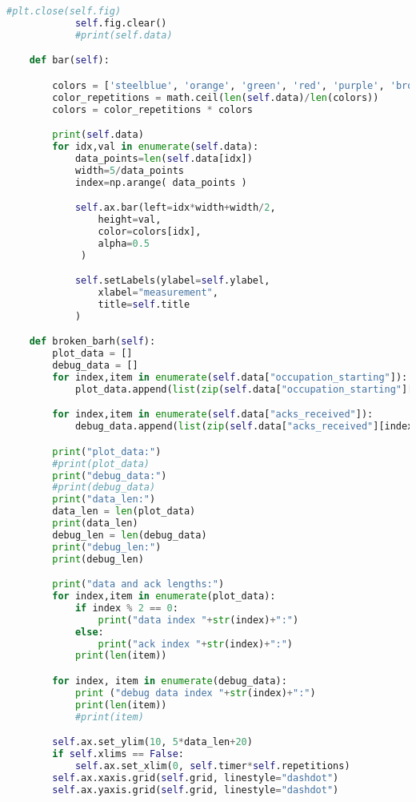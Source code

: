 \begin{lstlisting}[language=Python,caption=myplot.py]
            #plt.close(self.fig)
            self.fig.clear()
            #print(self.data)

    def bar(self):

        colors = ['steelblue', 'orange', 'green', 'red', 'purple', 'brown', 'pink']
        color_repetitions = math.ceil(len(self.data)/len(colors))
        colors = color_repetitions * colors

        print(self.data)
        for idx,val in enumerate(self.data):
            data_points=len(self.data[idx])
            width=5/data_points
            index=np.arange( data_points )

            self.ax.bar(left=idx*width+width/2,
                height=val,
                color=colors[idx],
                alpha=0.5
             )

            self.setLabels(ylabel=self.ylabel,
                xlabel="measurement",
                title=self.title
            )

    def broken_barh(self):
        plot_data = []
        debug_data = []
        for index,item in enumerate(self.data["occupation_starting"]):
            plot_data.append(list(zip(self.data["occupation_starting"][index], self.data["occupation_durations"][index])))

        for index,item in enumerate(self.data["acks_received"]):
            debug_data.append(list(zip(self.data["acks_received"][index], self.data["acks_received_bar_width"][index])))

        print("plot_data:")
        #print(plot_data)
        print("debug_data:")
        #print(debug_data)
        print("data_len:")
        data_len = len(plot_data)
        print(data_len)
        debug_len = len(debug_data)
        print("debug_len:")
        print(debug_len)

        print("data and ack lengths:")
        for index,item in enumerate(plot_data):
            if index % 2 == 0:
                print("data index "+str(index)+":")
            else:
                print("ack index "+str(index)+":")
            print(len(item))

        for index, item in enumerate(debug_data):
            print ("debug data index "+str(index)+":")
            print(len(item))
            #print(item)

        self.ax.set_ylim(10, 5*data_len+20)
        if self.xlims == False:
            self.ax.set_xlim(0, self.timer*self.repetitions)
        self.ax.xaxis.grid(self.grid, linestyle="dashdot")
        self.ax.yaxis.grid(self.grid, linestyle="dashdot")


\end{lstlisting}
